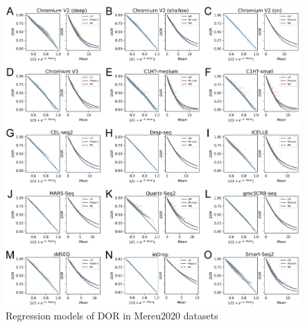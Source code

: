 \documentclass{article}
\begin{document}
\begin{figure}[htb]
  \centering
  \includegraphics[scale=0.7]{./figs/exported/mereu2020_lm.png}
  \caption{Regression models of DOR in Mereu2020 datasets}
  \label{fig_s7}
\end{figure}
\end{document}
